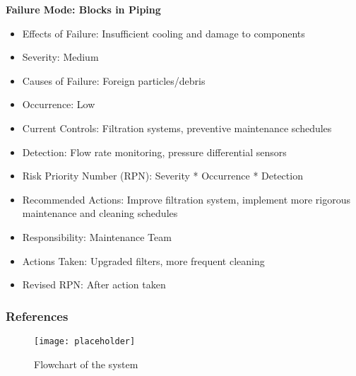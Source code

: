 \textbf{Failure Mode: Blocks in Piping}
\begin{itemize}
  \item Effects of Failure: Insufficient cooling and damage to components
  \item Severity: Medium
  \item Causes of Failure: Foreign particles/debris
  \item Occurrence: Low
  \item Current Controls: Filtration systems, preventive maintenance schedules
  \item Detection: Flow rate monitoring, pressure differential sensors
  \item Risk Priority Number (RPN): Severity * Occurrence * Detection
  \item Recommended Actions: Improve filtration system, implement more rigorous maintenance and cleaning schedules
  \item Responsibility: Maintenance Team
  \item Actions Taken: Upgraded filters, more frequent cleaning
  \item Revised RPN: After action taken
\end{itemize}
\subsubsection{References}

\begin{figure}[ht]
  \centering
  \texttt{[image: placeholder]}
  \caption{Flowchart of the system}
  \label{fig:schematic}
\end{figure}




